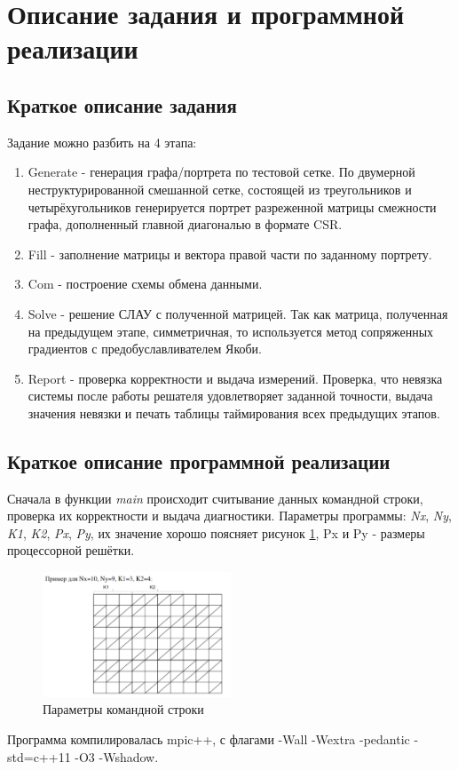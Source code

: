 \section{Описание задания и программной реализации}
	\subsection{Краткое описание задания}
		Задание можно разбить на 4 этапа:
		\begin{enumerate}
			\item Generate - генерация графа/портрета по тестовой сетке. По двумерной неструктурированной смешанной сетке, состоящей из треугольников и четырёхугольников генерируется портрет разреженной матрицы смежности графа, дополненный главной диагональю в формате CSR.
			\item Fill - заполнение матрицы и вектора правой части по заданному портрету.
			\item Com - построение схемы обмена данными.
			\item Solve - решение СЛАУ с полученной матрицей. Так как матрица, полученная на предыдущем этапе, симметричная, то используется метод сопряженных градиентов с предобуславливателем Якоби.
			\item Report - проверка корректности и выдача измерений. Проверка, что невязка системы после работы решателя удовлетворяет заданной точности, выдача значения невязки и печать таблицы таймирования всех предыдущих этапов.

		\end{enumerate}

	\subsection{Краткое описание программной реализации}
		Сначала в функции \textit{main} происходит считывание данных командной строки, проверка их корректности и выдача диагностики. Параметры программы: \textit{Nx}, \textit{Ny}, \textit{K1}, \textit{K2}, \textit{Px}, \textit{Py}, их значение хорошо поясняет рисунок \ref{param}, Px и Py - размеры процессорной решётки.
		\begin{figure}[H]
	        \centering
	        \includegraphics[width=0.5\textwidth]{./images/param}
	        \caption{Параметры командной строки}
	        \label{param}
	    \end{figure}
	    Программа компилировалась mpic++, с флагами -Wall -Wextra -pedantic -std=c++11 -O3 -Wshadow.

